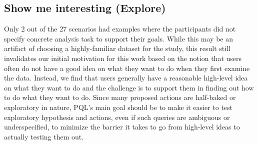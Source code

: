 \documentclass{sig-alternate-05-2015}
\begin{document}
\subsection{Show me interesting (Explore)}
\par Only 2 out of the 27 scenarios had examples where the participants did not specify concrete analysis task to support their goals. While this may be an artifact of choosing a highly-familiar dataset for the study, this result still invalidates our initial motivation for this work based on the notion that users often do not have a good idea on what they want to do when they first examine the data. Instead, we find that users generally have a reasonable high-level idea on what they want to do and the challenge is to support them in finding out how to do what they want to do. Since many proposed actions are half-baked or exploratory in nature, PQL's main goal should be to make it easier to test exploratory hypothesis and actions, even if such queries are ambiguous or underspecified, to minimize the barrier it takes to go from high-level ideas to actually testing them out.
\end{document}
